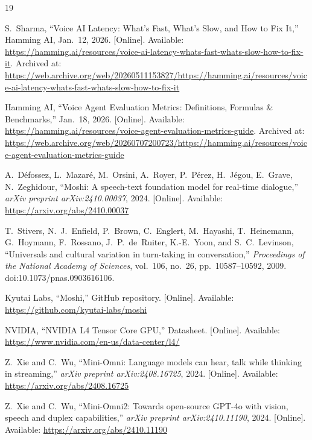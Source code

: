 \documentclass{article}
\begin{document}

\begin{thebibliography}{19}

	S.~Sharma, ``Voice AI Latency: What's Fast, What's Slow, and How to Fix It,'' Hamming AI, Jan.~12, 2026. [Online]. Available: \url{https://hamming.ai/resources/voice-ai-latency-whats-fast-whats-slow-how-to-fix-it}. Archived at: \url{https://web.archive.org/web/20260511153827/https://hamming.ai/resources/voice-ai-latency-whats-fast-whats-slow-how-to-fix-it}

	Hamming AI, ``Voice Agent Evaluation Metrics: Definitions, Formulas \& Benchmarks,'' Jan.~18, 2026. [Online]. Available: \url{https://hamming.ai/resources/voice-agent-evaluation-metrics-guide}. Archived at: \url{https://web.archive.org/web/20260707200723/https://hamming.ai/resources/voice-agent-evaluation-metrics-guide}

	A.~Défossez, L.~Mazaré, M.~Orsini, A.~Royer, P.~Pérez, H.~Jégou, E.~Grave, N.~Zeghidour, ``Moshi: A speech-text foundation model for real-time dialogue,'' \emph{arXiv preprint arXiv:2410.00037}, 2024. [Online]. Available: \url{https://arxiv.org/abs/2410.00037}

	T.~Stivers, N.~J.~Enfield, P.~Brown, C.~Englert, M.~Hayashi, T.~Heinemann, G.~Hoymann, F.~Rossano, J.~P.~de~Ruiter, K.-E.~Yoon, and S.~C.~Levinson, ``Universals and cultural variation in turn-taking in conversation,'' \emph{Proceedings of the National Academy of Sciences}, vol.~106, no.~26, pp.~10587--10592, 2009. doi:10.1073/pnas.0903616106.

	Kyutai Labs, ``Moshi,'' GitHub repository. [Online]. Available: \url{https://github.com/kyutai-labs/moshi}

	NVIDIA, ``NVIDIA L4 Tensor Core GPU,'' Datasheet. [Online]. Available: \url{https://www.nvidia.com/en-us/data-center/l4/}

	Z.~Xie and C.~Wu, ``Mini-Omni: Language models can hear, talk while thinking in streaming,'' \emph{arXiv preprint arXiv:2408.16725}, 2024. [Online]. Available: \url{https://arxiv.org/abs/2408.16725}

	Z.~Xie and C.~Wu, ``Mini-Omni2: Towards open-source GPT-4o with vision, speech and duplex capabilities,'' \emph{arXiv preprint arXiv:2410.11190}, 2024. [Online]. Available: \url{https://arxiv.org/abs/2410.11190}


\end{thebibliography}
\end{document}
